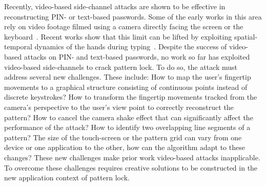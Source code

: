 Recently, video-based side-channel attacks are shown to be effective in reconstructing PIN- or
text-based passwords. Some of the early works in this area rely on video
footage filmed using a camera directly facing the screen or the keyboard~\cite{
kuhn2002compromising, balzarotti2008clearshot}. Recent works show that
this limit can be lifted by exploiting spatial-temporal dynamics of
the hands during typing~\cite{shukla2014beware}.
Despite the success of
video-based attacks on PIN- and text-based passwords, no work so far has
exploited video-based side-channels to crack pattern lock.
To do so, the attack must address several new challenges. These include: How to map the user's fingertip
movements to a graphical structure consisting of continuous points instead of discrete
keystrokes? How to transform the fingertip movements tracked from
the camera's perspective to the user's view point to correctly reconstruct the
pattern? How to cancel the camera shake effect that can significantly
affect the performance of the attack? How to identify two overlapping line segments
of a pattern? The size of the touch-screen or the pattern grid
can vary from one device or one application to the other, how can the algorithm
adapt to these changes?
These new challenges make prior work video-based attacks inapplicable.
To overcome these challenges requires creative
solutions to be constructed in the new application context of pattern lock.



